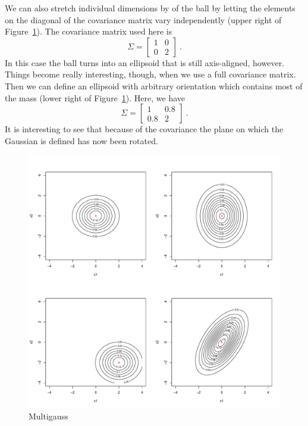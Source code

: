 \documentclass[a4paper,11pt,leqno]{report}\usepackage[]{graphicx}\usepackage[]{color}
\makeatletter
\def\maxwidth{ %
  \ifdim\Gin@nat@width>\linewidth
    \linewidth
  \else
    \Gin@nat@width
  \fi
}
\newenvironment{knitrout}{}{} %
\makeatother
\begin{document}
We can also stretch individual dimensions by of the ball by letting the elements on the diagonal of the
covariance matrix vary independently (upper right of Figure~\ref{fig:multiGauss}). The covariance matrix used here is 
\begin{equation*}
\Sigma = \begin{bmatrix}
1 & 0 \\
0 & 2
\end{bmatrix} \ .
\end{equation*}
In this case the ball turns into an ellipsoid that is still axis-aligned, however. 
Things become really interesting, though, when we use a full covariance matrix. Then we can define an 
ellipsoid with arbitrary orientation which contains most of the mass (lower right of Figure~\ref{fig:multiGauss}). Here, we have
\begin{equation*}
\Sigma = \begin{bmatrix}
1 & 0.8 \\
0.8 & 2
\end{bmatrix} \ .
\end{equation*}
It is interesting to see that because of the covariance the plane on which the Gaussian is defined has now been rotated.

\begin{figure}
\begin{knitrout}
\color{fgcolor}
\includegraphics[width=\maxwidth]{figures/multiGauss-1} 

\end{knitrout}
\caption{Multigauss}
\label{fig:multiGauss}
\end{figure}
\end{document}
